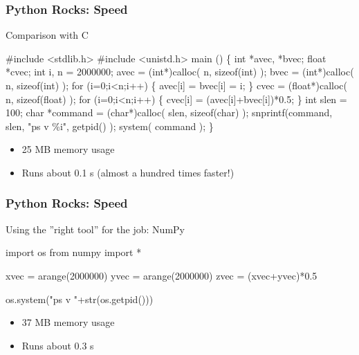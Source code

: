 \documentclass[t,10pt,compress=false,usepdftitle=false]{beamer}
\begin{document}
\begin{frame}[fragile]
    \frametitle{Python Rocks: Speed}
    Comparison with C
\begin{myColorBox}{0.9}{}
\begin{semiverbatim}
\tiny#include <stdlib.h>
#include <unistd.h>
main () \{
    int *avec, *bvec;
    float *cvec;
    int i, n = 2000000;
    avec = (int*)calloc( n, sizeof(int) );
    bvec = (int*)calloc( n, sizeof(int) );
    for (i=0;i<n;i++) \{
        avec[i] = bvec[i] = i;
    \}
    cvec = (float*)calloc( n, sizeof(float) );
    for (i=0;i<n;i++) \{
        cvec[i] = (avec[i]+bvec[i])*0.5;
    \}
    int slen = 100;
    char *command = (char*)calloc( slen, sizeof(char) );
    snprintf(command, slen, "ps v \%i", getpid() );
    system( command );
\}
\end{semiverbatim}
\end{myColorBox}
    \begin{itemize}
    	\item 25 MB memory usage
	\item Runs about 0.1 s (almost a hundred times faster!)
    \end{itemize}
\end{frame}

\begin{frame}[fragile]
    \frametitle{Python Rocks: Speed}
    Using the ''right tool'' for the job: NumPy
\begin{myColorBox}{0.9}{}
\begin{semiverbatim}
import os
from numpy import *

xvec = arange(2000000)
yvec = arange(2000000)
zvec = (xvec+yvec)*0.5

os.system("ps v "+str(os.getpid()))
\end{semiverbatim}
\end{myColorBox}
    \begin{itemize}
    	\item 37 MB memory usage
	\item Runs about 0.3 s
    \end{itemize}
\end{frame}
\end{document}
